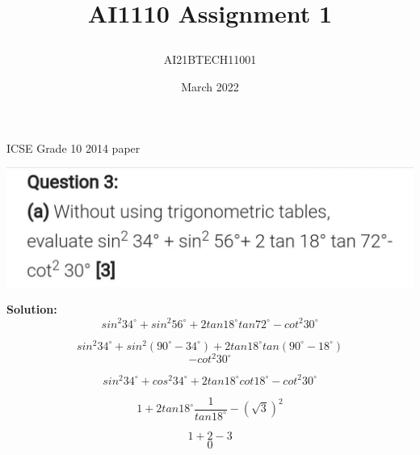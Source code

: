 \documentclass[journal,12pt,twocolumn]{IEEEtran}
\title{\textbf{AI1110 Assignment 1}
\author{AI21BTECH11001 }}
\date{March 2022}
\newcommand{\C}{\circ}
\begin{document}
\maketitle
\begin{center}
{ICSE Grade 10 2014 paper}\end{center}

\includegraphics[scale=0.22]{main.jpeg}

\textbf{Solution:}
$$sin^2 34^\C + sin^2 56^\C +2tan 18^\C tan 72^\C - cot^2 30^\C $$


$$sin^2 34^\C + sin^2(90^\C - 34^\C)+2tan18^\C tan(90^\C- 18^\C) $$
$$- cot^2 30^\C$$

$$sin^2 34^\C + cos^2 34^\C +2tan18^\C cot18^\C - cot^2 30^\C $$

$$1 + 2tan18 ^\C \frac{1}{tan18^\C} - (\sqrt{3})^2$$

$$1 + 2 - 3$$
$$0$$
\end{document}
